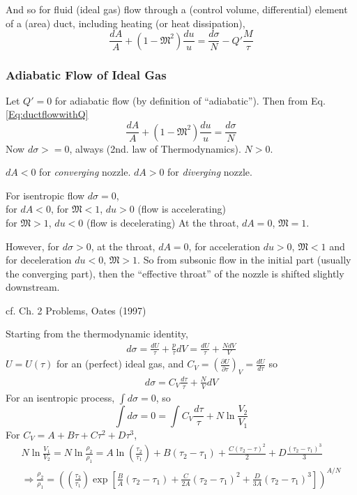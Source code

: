\documentclass[10pt]{amsart}
\newcommand{\problemhead}[1]
  {
   \noindent{\small\bf Problem #1.}
   }
\begin{document}
\begin{multicols*}{2}
And so for fluid (ideal gas) flow through a (control volume, differential) element of a (area) duct, including heating (or heat dissipation), 
\begin{equation}\label{Eq:ductflowwithQ}
  \frac{dA}{A} + (1 - \mathfrak{M}^2) \frac{du}{u} = \frac{d\sigma}{N} - Q' \frac{M}{\tau}
\end{equation}

\subsubsection{Adiabatic Flow of Ideal Gas}

Let $Q'=0$ for adiabatic flow (by definition of ``adiabatic'').  Then from Eq. \ref{Eq:ductflowwithQ}
\[
\frac{dA}{A} + (1-\mathfrak{M}^2) \frac{du}{u} = \frac{d\sigma}{N}
\]
Now $d\sigma >=0$, always (2nd. law of Thermodynamics).  $N>0$.  

$dA<0$ for \emph{converging} nozzle.  
$dA >0$ for \emph{diverging} nozzle.

For isentropic flow $d\sigma =0$,  \\
for $dA<0$, for $\mathfrak{M}<1$, $du >0$ (flow is accelerating) \\
\phantom{for $dA<0$, } for $\mathfrak{M}>1$, $du <0$ (flow is decelerating)
\phantom{for $dA<0$, } At the throat, $dA=0$, $\mathfrak{M}=1$.  

However, for $d\sigma >0$, at the throat, $dA=0$, for acceleration $du>0$, $\mathfrak{M}<1$ and for deceleration $du<0$, $\mathfrak{M}>1$.  So from subsonic flow in the initial part (usually the converging part), then the ``effective throat'' of the nozzle is shifted slightly downstream.  




cf. Ch. 2 Problems, Oates (1997) \cite{GOates1997}

\problemhead{2.1}

Starting from the thermodynamic identity,
\[
\begin{gathered}
  d\sigma = \frac{dU}{\tau} + \frac{p}{\tau} dV  = \frac{dU}{\tau} + \frac{N dV}{V} 
\end{gathered}
\]
$U=U(\tau)$ for an (perfect) ideal gas, and $C_V = \left( \frac{ \partial U}{ \partial \tau} \right)_V = \frac{dU}{d\tau}$ so
\[
\begin{gathered}
  d\sigma = C_V \frac{d\tau}{\tau} + \frac{N}{V} dV
\end{gathered}
\]
For an isentropic process, $\int d\sigma =0$, so 
\[
\int d\sigma = 0 = \int C_V \frac{d\tau}{\tau} + N \ln{ \frac{V_2}{V_1}}
\]
For $C_V = A + B\tau + C\tau^2 + D\tau^3$,
\[
\begin{gathered}
  N \ln{ \frac{V_1}{V_2}} = N \ln{ \frac{\rho_2}{\rho_1} } = A\ln{ \left( \frac{\tau_2}{\tau_1} \right) } + B(\tau_2 - \tau_1) + \frac{C(\tau_2 - \tau)^2}{2} + D \frac{(\tau_2-\tau_1)^3}{3} \\
  \Longrightarrow \frac{ \rho_2}{\rho_1} = \left( \left( \frac{\tau_2}{\tau_1} \right) \exp{ \left[ \frac{B}{A} (\tau_2-\tau_1) + \frac{C}{2A} (\tau_2-\tau_1)^2 + \frac{D}{3A} (\tau_2-\tau_1)^3 \right] } \right)^{A/N}
\end{gathered}
\]


\end{multicols*}
\end{document}
